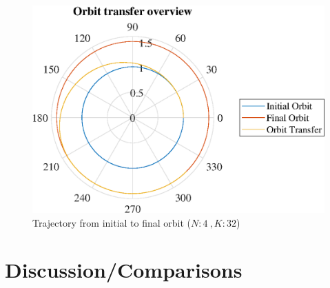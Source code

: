 \documentclass[]{article}
\begin{document}
	\begin{figure}
		\centering
		\includegraphics[scale=0.75]{orbit_N4_K32_C3_mf.eps}
		\caption{Trajectory from initial to final orbit (\(N:4\ , K:32\))}
		\label{fig:orbit_N4_K32_C3_mf}
	\end{figure}
	\FloatBarrier
	\section{Discussion/Comparisons}
\end{document}
